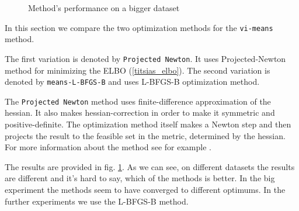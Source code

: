 \begin{figure}[t!]
	\centering
	\subfloat{
		\scalebox{0.75}{
			
		}
	}
	\subfloat{
		\scalebox{0.75}{
    		
		}
	}

	\subfloat{
		\scalebox{0.75}{
			
		}
	}
	\subfloat{
		\scalebox{0.75}{
			
		}
	}
	\caption{Method's performance on a bigger dataset}
	\label{vi_results}
\end{figure}

In this section we compare the two optimization methods for the \lstinline{vi-means} method.

The first variation is denoted by \lstinline{Projected Newton}. It uses Projected-Newton method for minimizing the ELBO (\ref{titsias_elbo}). The second variation is denoted by \lstinline{means-L-BFGS-B} and uses L-BFGS-B optimization method.

The \lstinline{Projected Newton} method uses finite-difference approximation of the hessian. It also makes hessian-correction in order to make it symmetric and positive-definite. The optimization method itself makes a Newton step and then projects the result to the feasible set in the metric, determined by the hessian. For more information about the method see for example \cite{ProjNewton}.

The results are provided in fig. \ref{vi_results}. As we can see, on different datasets the results are different and it's hard to say, which of the methods is better. In the big experiment the methods seem to have converged to different optimums. In the further experiments we use the L-BFGS-B method.